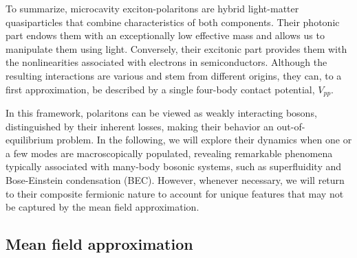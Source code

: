 \indent 

To summarize, microcavity exciton-polaritons are hybrid light-matter quasiparticles that combine characteristics of both components. 
Their photonic part endows them with an exceptionally low effective mass and allows us to manipulate them using light. 
Conversely, their excitonic part provides them with the nonlinearities associated with electrons in semiconductors. 
Although the resulting interactions are various and stem from different origins, they can, to a first approximation, be described by a single four-body contact potential, $V_{pp}$.

In this framework, polaritons can be viewed as weakly interacting bosons, distinguished by their inherent losses, making their behavior an out-of-equilibrium problem. 
In the following, we will explore their dynamics when one or a few modes are macroscopically populated, revealing remarkable phenomena typically associated with many-body bosonic systems, such as superfluidity and Bose-Einstein condensation (BEC).
 However, whenever necessary, we will return to their composite fermionic nature to account for unique features that may not be captured by the mean field approximation.
 
\subsection{Mean field approximation}

\indent

